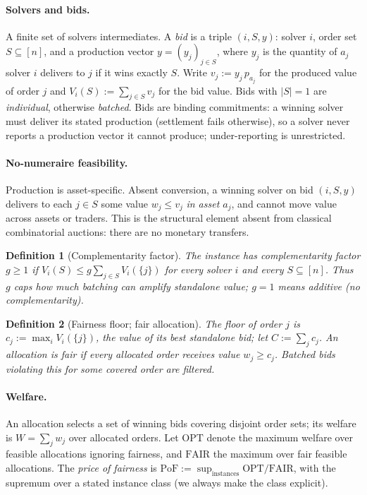 \documentclass[11pt]{article}
\newtheorem{definition}{Definition}
\theoremstyle{remark}
\newcommand{\OPT}{\mathrm{OPT}}
\newcommand{\FAIR}{\mathrm{FAIR}}
\newcommand{\PoF}{\mathrm{PoF}}
\begin{document}
\paragraph{Solvers and bids.}
A finite set of solvers intermediates. A \emph{bid} is a triple $(i,S,y)$:
solver $i$, order set $S\subseteq[n]$, and a production vector
$y=(y_j)_{j\in S}$, where $y_j$ is the quantity of $a_j$ solver $i$ delivers
to $j$ if it wins exactly $S$. Write $v_j:=y_j\,p_{a_j}$ for the produced
value of order $j$ and $V_i(S):=\sum_{j\in S}v_j$ for the bid value. Bids
with $|S|=1$ are \emph{individual}, otherwise \emph{batched}. Bids are
binding commitments: a winning solver must deliver its stated production
(settlement fails otherwise), so a solver never reports a production vector
it cannot produce; under-reporting is unrestricted.

\paragraph{No-numeraire feasibility.}
Production is asset-specific. Absent conversion, a winning solver on bid
$(i,S,y)$ delivers to each $j\in S$ some value $w_j\le v_j$ \emph{in asset
$a_j$}, and cannot move value across assets or traders. This is the
structural element absent from classical combinatorial auctions: there are
no monetary transfers.

\begin{definition}[Complementarity factor]\label{def:g}
The instance has complementarity factor $g\ge1$ if
$V_i(S)\le g\sum_{j\in S}V_i(\{j\})$ for every solver $i$ and every
$S\subseteq[n]$. Thus $g$ caps how much batching can amplify standalone
value; $g=1$ means additive (no complementarity).
\end{definition}

\begin{definition}[Fairness floor; fair allocation]\label{def:fair}
The \emph{floor} of order $j$ is $c_j:=\max_i V_i(\{j\})$, the value of its
best standalone bid; let $C:=\sum_j c_j$. An allocation is \emph{fair} if
every allocated order receives value $w_j\ge c_j$. Batched bids violating
this for some covered order are \emph{filtered}.
\end{definition}

\paragraph{Welfare.}
An allocation selects a set of winning bids covering disjoint order sets;
its welfare is $W=\sum_j w_j$ over allocated orders. Let $\OPT$ denote the
maximum welfare over feasible allocations ignoring fairness, and $\FAIR$ the
maximum over fair feasible allocations. The \emph{price of fairness} is
$\PoF:=\sup_{\text{instances}}\OPT/\FAIR$, with the supremum over a stated
instance class (we always make the class explicit).
\end{document}
